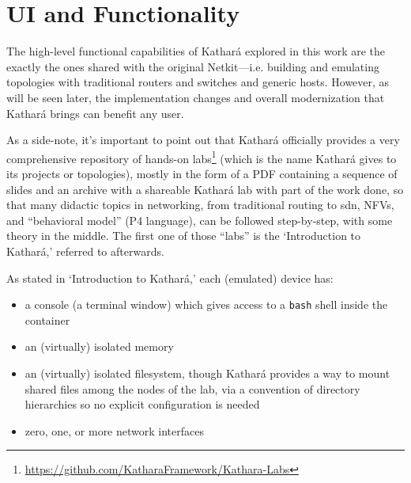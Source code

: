 \section{UI and Functionality}
\label{sec:katharafunctionality}


The high-level functional capabilities of Kathará explored in this work are the exactly the ones shared with the original Netkit---i.e. building and emulating topologies with traditional routers and switches and generic hosts.
However, as will be seen later, the implementation changes and overall modernization that Kathará brings can benefit any user.

As a side-note, it's important to point out that Kathará officially provides a very comprehensive repository of hands-on labs\footnote{\mbox{\url{https://github.com/KatharaFramework/Kathara-Labs}}} (which is the name Kathará gives to its projects or topologies), mostly in the form of a PDF containing a sequence of slides and an archive with a shareable Kathará lab with part of the work done, so that many didactic topics in networking, from traditional routing to \gls{sdn}, NFVs, and ``behavioral model'' (P4 language), can be followed step-by-step, with some theory in the middle.
The first one of those ``labs'' is the `Introduction to Kathará,' referred to afterwards.



As stated in `Introduction to Kathará,' each (emulated) device has:
\begin{itemize}
  \item a console (a terminal window) which gives access to a \texttt{bash} shell inside the container
  \item an (virtually) isolated memory
  \item an (virtually) isolated filesystem, though Kathará provides a way to mount shared files among the nodes of the lab, via a convention of directory hierarchies so no explicit configuration is needed
  \item zero, one, or more network interfaces
\end{itemize}

